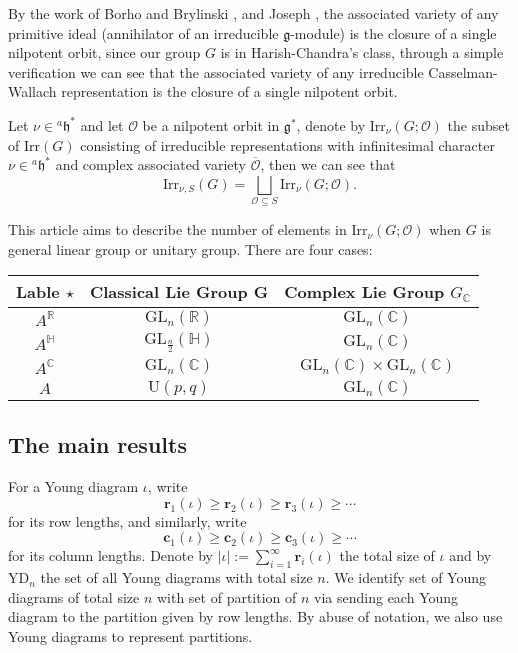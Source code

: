 \documentclass[12pt, a4paper]{amsart}
\numberwithin{equation}{section}
\newcommand{\br}{{\mathbf{r}}}
\newcommand{\bc}{{\mathbf{c}}}
\newcommand{\BC}{{\mathbb {C}}}
\newcommand{\BH}{{\mathbb {H}}}
\newcommand{\BR}{{\mathbb {R}}}
\newcommand{\CO}{{\mathcal {O}}}
\newcommand{\fg}{\mathfrak{g}}
\newcommand{\fh}{\mathfrak{h}}
\newcommand{\GL}{{\mathrm{GL}}}
\newcommand{\U}{{\mathrm{U}}}
\newcommand{\Irr}{{\mathrm{Irr}}}
\renewcommand{\bar}{\overline}
\begin{document}
By the work of Borho and Brylinski \cite{BB}, and Joseph \cite{Jos}, the associated variety of any primitive ideal (annihilator of an irreducible $\fg$-module) is the closure of a single nilpotent orbit, since our group $G$ is in Harish-Chandra's class, through a simple verification we can see that the associated variety of any irreducible Casselman-Wallach representation is the closure of a single nilpotent orbit.

Let $\nu \in {^{a}\fh^*}$ and let $\CO$ be a nilpotent orbit in $\fg^*$,   denote by $\Irr_{\nu}(G;\CO)$ the subset of $\Irr(G)$ consisting of irreducible representations with infinitesimal character $\nu \in {^{a}\fh^*}$ and complex associated variety $\bar{\CO}$, then we can see that
\begin{equation}\label{(1.3)}
    \Irr_{\nu,S}(G) = \bigsqcup_{\CO \subseteq S} \Irr_{\nu}(G;\CO).
\end{equation}

This article aims to describe the number of elements in $\Irr_{\nu}(G;\CO)$ when $G$ is general linear group or unitary group. There are four cases:

\begin{center}
   \begin{tabular}{ccc}
      \toprule
      Lable $\star $ & Classical Lie Group G & Complex Lie Group $G_{\BC}$    \\
      \midrule
      $A^{\BR}$      & $\GL_n(\BR)$          & $\GL_n(\BC)$                   \\
      $A^{\BH}$      & $\GL_{\frac{n}{2}}(\BH)$      & $\GL_n(\BC)$                   \\
      $A^{\BC}$      & $\GL_n(\BC)$          & $\GL_n(\BC) \times \GL_n(\BC)$ \\
      $A$            & $\U(p,q)$              & $\GL_n(\BC)$                   \\
      \bottomrule
   \end{tabular}
\end{center}



\subsection{The main results}
For a Young diagram $\iota$, write
$$\br_1(\iota) \geq \br_2(\iota) \geq \br_3(\iota) \geq \cdots$$
for its row lengths, and similarly, write
$$\bc_1(\iota) \geq \bc_2(\iota) \geq \bc_3(\iota) \geq \cdots$$
for its column lengths. Denote by $|\iota|:= \sum_{i=1}^{\infty}\br_i(\iota)$ the total size of $\iota$ and by $\mathrm{YD}_{n}$ the set of all Young diagrams with total size $n$. We identify set of Young diagrams of total size $n$ with set of partition of $n$ via sending each Young diagram to the partition given by row lengths. By abuse of notation, we also use Young diagrams to represent partitions.
\end{document}
